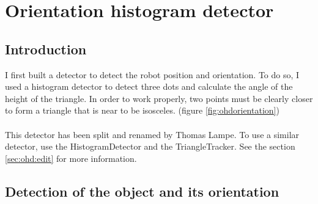 \section[Orientation histogram detector (Triangle tracker)]{Orientation histogram detector}
\label{sec:ohd}

\subsection{Introduction}
\label{sec:ohd:intro}


    I first built a detector to detect the robot position and orientation. 
    To do so, I used a histogram detector to detect three dots and calculate
    the angle of the height of the triangle. In order to work properly, two 
    points must be clearly closer to form a triangle that is near to be 
    isosceles. (figure \ref{fig:ohdorientation})
\\
\\
    This detector has been split and renamed by Thomas Lampe. 
    To use a similar detector, 
    use the HistogramDetector and the 
    TriangleTracker. See the section \ref{sec:ohd:edit} for more 
    information.

\subsection{Detection of the object and its orientation}
\label{sec:ohd:detection}

